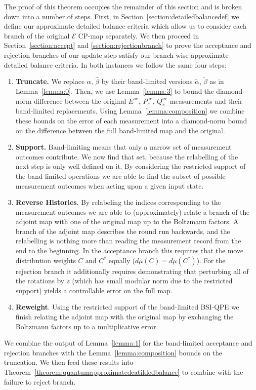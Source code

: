 \documentclass[aps,floatfix,10pt,amssymb,amsfont,amsmath,superscriptaddress,float,nofootinbib,longbibliography,nobalancelastpage,twocolumn]{revtex4-2}
\begin{document}
The proof of this theorem occupies the remainder of this section and is broken down into a number of steps. First, in Section~\ref{section:detailedbalancedef} we define our approximate detailed balance criteria which allow us to consider each branch of the original $\mathcal{E}$ CP-map separately. We then proceed in Section~\ref{section:accept} and \ref{section:rejectionbranch} to prove the acceptance and rejection branches of our update step satisfy our branch-wise approximate detailed balance criteria. In both instances we follow the same four steps:
\begin{enumerate}
    \item \textbf{Truncate.} We replace $\hat \alpha$, $\hat \beta$ by their band-limited versions $\tilde \alpha$, $\tilde \beta$ as in Lemma~\ref{lemma:0}. Then, we use Lemma~\ref{lemma:3} to bound the diamond-norm difference between the original $E^{ae}$, $P_s^{ae}$, $Q_s^{ae}$ measurements and their band-limited replacements. Using Lemma~\ref{lemma:composition} we combine these bounds on the error of each measurement into a diamond-norm bound on the difference between the full band-limited map and the original.
    \item \textbf{Support.} Band-limiting means that only a narrow set of measurement outcomes contribute. We now find that set, because the relabelling of the next step is only well defined on it. By considering the restricted support of the band-limited operations we are able to find the subset of possible measurement outcomes when acting upon a given input state.
    \item \textbf{Reverse Histories.} By relabeling the indices corresponding to the measurement outcomes we are able to (approximately) relate a branch of the adjoint map with one of the original map up to the Boltzmann factors. A branch of the adjoint map describes the round run backwards, and the relabelling is nothing more than reading the measurement record from the end to the beginning. In the acceptance branch this requires that the move distribution weights $C$ and $C^{\dagger}$ equally ($d\mu(C) = d\mu(C^{\dagger})$). For the rejection branch it additionally requires demonstrating that perturbing all of the rotations by $z$ (which has small modular norm due to the restricted support) yields a controllable error on the full map.
    \item \textbf{Reweight}. Using the restricted support of the band-limited BSI-QPE we finish relating the adjoint map with the original map by exchanging the Boltzmann factors up to a multiplicative error.
\end{enumerate}
We combine the output of Lemma~\ref{lemma:1} for the band-limited acceptance and rejection branches with the Lemma~\ref{lemma:composition} bounds on the truncation. We then feed these results into Theorem~\ref{theorem:quantumapproximatedeatildedbalance} to combine with the failure to reject branch.
\end{document}
